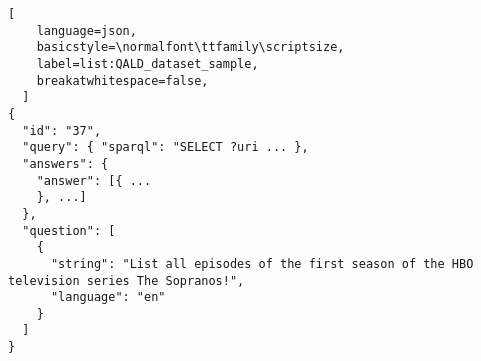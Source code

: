 \begin{lstlisting}[
    language=json,
    basicstyle=\normalfont\ttfamily\scriptsize,
    label=list:QALD_dataset_sample,
    breakatwhitespace=false,
  ]
{
  "id": "37",
  "query": { "sparql": "SELECT ?uri ... },
  "answers": {
    "answer": [{ ...
    }, ...]
  },
  "question": [
    {
      "string": "List all episodes of the first season of the HBO television series The Sopranos!",
      "language": "en"
    }
  ]
}
\end{lstlisting}
